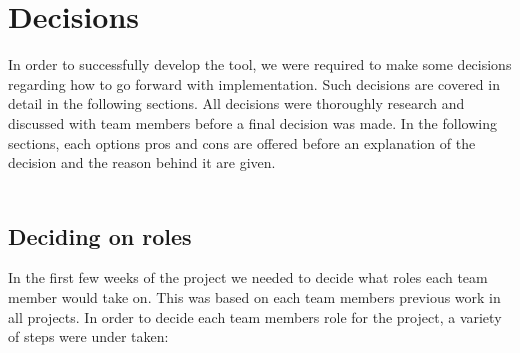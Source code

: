 \section{Decisions}

In order to successfully develop the tool, we were required to make some decisions regarding how to go forward with implementation. Such decisions are covered in detail in the following sections. All decisions were thoroughly research and discussed with team members before a final decision was made. In the following sections, each options pros and cons are offered before an explanation of the decision and the reason behind it are given.\\
\\ 

\subsection{Deciding on roles}
In the first few weeks of the project we needed to decide what roles each team member would take on.  This was based on each team members previous work in all projects. In order to decide each team members role for the project, a variety of steps were under taken:
